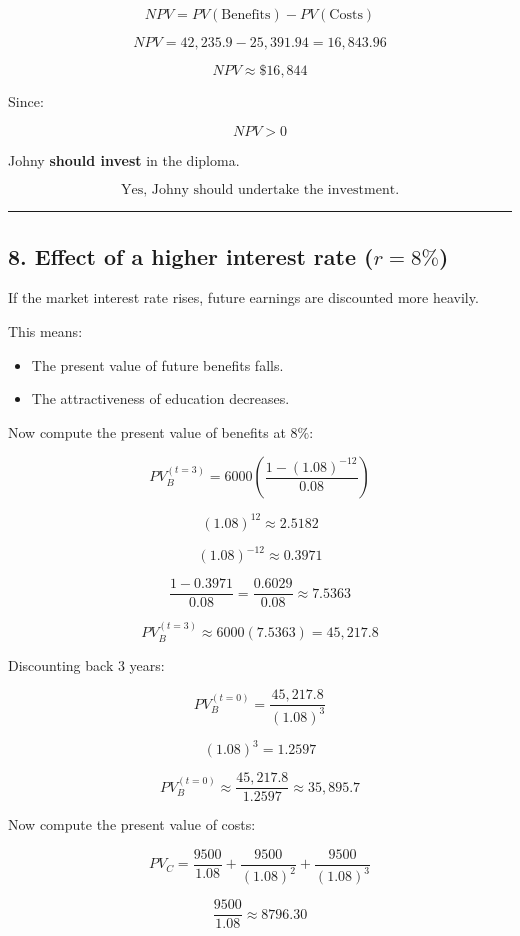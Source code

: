 \documentclass[12pt]{article}
\begin{document}
\[
NPV = PV(\text{Benefits}) - PV(\text{Costs})
\]

\[
NPV = 42{,}235.9 - 25{,}391.94 = 16{,}843.96
\]

\[
\boxed{NPV \approx \$16{,}844}
\]

Since:

\[
NPV > 0
\]

Johny \textbf{should invest} in the diploma.

\[
\boxed{\text{Yes, Johny should undertake the investment.}}
\]

\hrule
\vspace{0.5em}

\subsection*{8. Effect of a higher interest rate (\(r=8\%\))}

If the market interest rate rises, future earnings are discounted more heavily.

This means:

\begin{itemize}
    \item The present value of future benefits falls.
    \item The attractiveness of education decreases.
\end{itemize}

Now compute the present value of benefits at \(8\%\):

\[
PV_B^{(t=3)} = 6000 \left( \frac{1-(1.08)^{-12}}{0.08} \right)
\]

\[
(1.08)^{12} \approx 2.5182
\]

\[
(1.08)^{-12} \approx 0.3971
\]

\[
\frac{1-0.3971}{0.08} = \frac{0.6029}{0.08} \approx 7.5363
\]

\[
PV_B^{(t=3)} \approx 6000(7.5363) = 45{,}217.8
\]

Discounting back 3 years:

\[
PV_B^{(t=0)} = \frac{45{,}217.8}{(1.08)^3}
\]

\[
(1.08)^3 = 1.2597
\]

\[
PV_B^{(t=0)} \approx \frac{45{,}217.8}{1.2597} \approx 35{,}895.7
\]

Now compute the present value of costs:

\[
PV_C = \frac{9500}{1.08} + \frac{9500}{(1.08)^2} + \frac{9500}{(1.08)^3}
\]

\[
\frac{9500}{1.08} \approx 8796.30
\]
\end{document}
